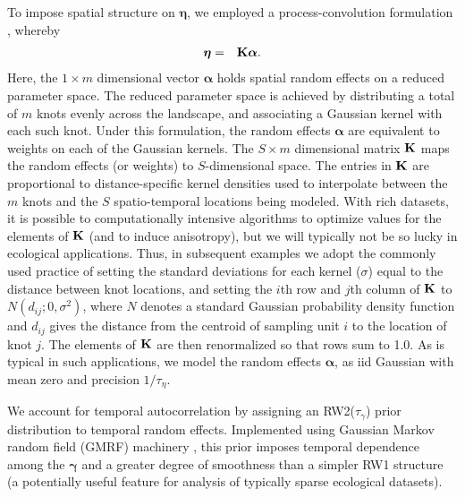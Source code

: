 \documentclass[12pt,fleqn]{article}
\begin{document}
\begin{flushleft}
\hspace{.5in} To impose spatial structure on $\boldsymbol{\eta}$, we employed a process-convolution formulation \citep[see e.g.][]{Higdon1998,CalderEtAl2002}, whereby
\begin{eqnarray}
   \boldsymbol{\eta} & = & {\bf K} \boldsymbol{\alpha}.
 \label{eq:reduced-spat}
\end{eqnarray}
Here, the $1 \times m$ dimensional vector $\boldsymbol{\alpha}$ holds spatial random effects on a reduced parameter space.  The reduced parameter space is achieved by distributing a total of $m$ knots evenly across the landscape, and associating a Gaussian kernel with each such knot. Under this formulation, the random effects $\boldsymbol{\alpha}$ are equivalent to weights on each of the Gaussian kernels.  The $S \times m$ dimensional matrix ${\bf K}$ maps the random effects (or weights) to $S$-dimensional space.  The entries in ${\bf K}$ are proportional to distance-specific kernel densities used to interpolate between the $m$ knots and the $S$ spatio-temporal locations being modeled.  With rich datasets, it is possible to computationally intensive algorithms to optimize values for the elements of ${\bf K}$ (and to induce anisotropy), but we will typically not be so lucky in ecological applications.  Thus, in subsequent examples we adopt the commonly used practice of setting the standard deviations for each kernel ($\sigma$) equal to the distance between knot locations, and setting the $i$th row and $j$th column of ${\bf K}$ to $N(d_{ij}; 0,\sigma^2)$, where $N$ denotes a standard Gaussian probability density function and $d_{ij}$ gives the distance from the centroid of sampling unit $i$ to the location of knot $j$.  The elements of ${\bf K}$ are then renormalized so that rows sum to 1.0.
As is typical in such applications, we model the random effects $\boldsymbol{\alpha}$, as iid Gaussian with mean zero and precision $1/\tau_\eta$.

\hspace{.5in} We account for temporal autocorrelation by assigning an RW2($\tau_\gamma$) prior distribution \citep[see e.g.][section 3.4]{RueHeld2005} to temporal random effects.  Implemented using Gaussian Markov random field (GMRF) machinery \citep[again see][for a thorough treatment]{RueHeld2005}, this prior imposes temporal dependence among the $\boldsymbol{\gamma}$  and a greater degree of smoothness than a simpler RW1 structure (a potentially useful feature for analysis of typically sparse ecological datasets).


\end{flushleft}
\end{document}
